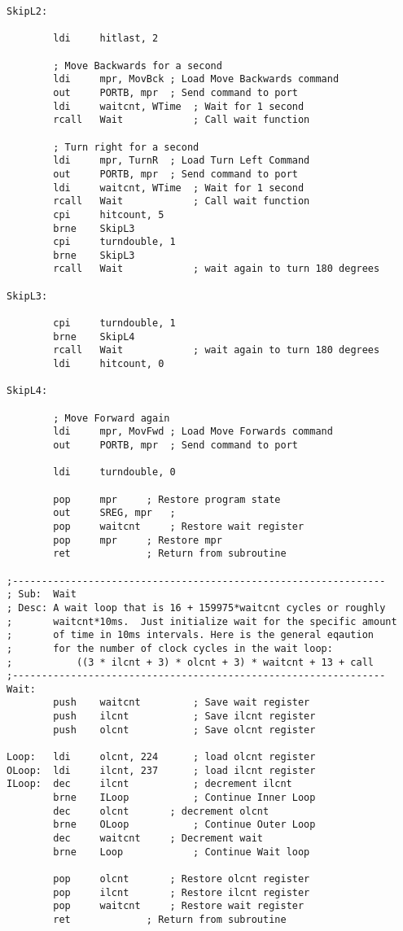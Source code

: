 \documentclass[12pt,letterpaper]{article}
\begin{document}
\begin{verbatim}
SkipL2:

        ldi     hitlast, 2

		; Move Backwards for a second
		ldi		mpr, MovBck	; Load Move Backwards command
		out		PORTB, mpr	; Send command to port
		ldi		waitcnt, WTime	; Wait for 1 second
		rcall	Wait			; Call wait function

		; Turn right for a second
		ldi		mpr, TurnR	; Load Turn Left Command
		out		PORTB, mpr	; Send command to port
		ldi		waitcnt, WTime	; Wait for 1 second
		rcall	Wait			; Call wait function
        cpi     hitcount, 5
        brne    SkipL3
		cpi     turndouble, 1
        brne    SkipL3
		rcall	Wait			; wait again to turn 180 degrees

SkipL3:

		cpi     turndouble, 1
        brne    SkipL4
		rcall	Wait			; wait again to turn 180 degrees
        ldi     hitcount, 0

SkipL4:

		; Move Forward again	
		ldi		mpr, MovFwd	; Load Move Forwards command
		out		PORTB, mpr	; Send command to port

		ldi		turndouble, 0

		pop		mpr		; Restore program state
		out		SREG, mpr	;
		pop		waitcnt		; Restore wait register
		pop		mpr		; Restore mpr
		ret				; Return from subroutine

;----------------------------------------------------------------
; Sub:	Wait
; Desc:	A wait loop that is 16 + 159975*waitcnt cycles or roughly 
;		waitcnt*10ms.  Just initialize wait for the specific amount 
;		of time in 10ms intervals. Here is the general eqaution
;		for the number of clock cycles in the wait loop:
;			((3 * ilcnt + 3) * olcnt + 3) * waitcnt + 13 + call
;----------------------------------------------------------------
Wait:
		push	waitcnt			; Save wait register
		push	ilcnt			; Save ilcnt register
		push	olcnt			; Save olcnt register

Loop:	ldi		olcnt, 224		; load olcnt register
OLoop:	ldi		ilcnt, 237		; load ilcnt register
ILoop:	dec		ilcnt			; decrement ilcnt
		brne	ILoop			; Continue Inner Loop
		dec		olcnt		; decrement olcnt
		brne	OLoop			; Continue Outer Loop
		dec		waitcnt		; Decrement wait 
		brne	Loop			; Continue Wait loop	

		pop		olcnt		; Restore olcnt register
		pop		ilcnt		; Restore ilcnt register
		pop		waitcnt		; Restore wait register
		ret				; Return from subroutine
\end{verbatim}
\end{document}
